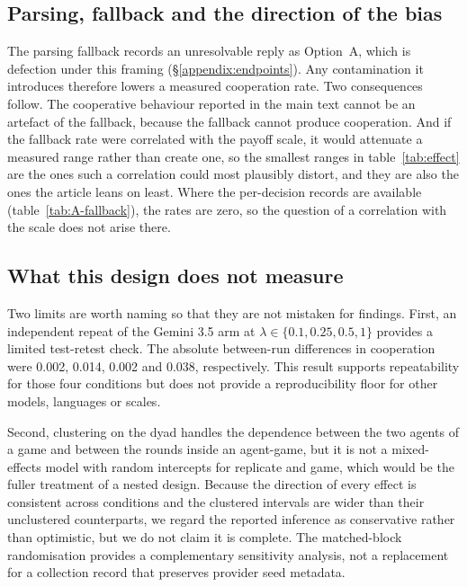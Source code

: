 \documentclass[openacc]{rsproca_new}
\newcommand{\lam}{\lambda}
\newcommand{\rev}[1]{{\color{red}#1}}
\newcommand{\rev}[1]{#1}
\begin{document}
\subsection{Parsing, fallback and the direction of the bias}\label{appendix:robust_parsing}

The parsing fallback records an unresolvable reply as Option~A, which is
defection under this framing (\S\ref{appendix:endpoints}). Any contamination it
introduces therefore lowers a measured cooperation rate. Two consequences
follow. The cooperative behaviour reported in the main text cannot be an
artefact of the fallback, because the fallback cannot produce cooperation. And
if the fallback rate were correlated with the payoff scale, it would attenuate
a measured range rather than create one, so the smallest ranges in
table~\ref{tab:effect} are the ones such a correlation could most plausibly
distort, and they are also the ones the article leans on least. \rev{Where the
per-decision records are available (table~\ref{tab:A-fallback}), the rates are
zero, so the question of a correlation with the scale does not arise there.}

\subsection{What this design does not measure}\label{appendix:robust_gaps}

Two limits are worth naming so that they are not mistaken for findings.
First, an independent repeat of the Gemini 3.5 arm at $\lam \in
\{0.1,0.25,0.5,1\}$ provides a limited test-retest check. The absolute
between-run differences in cooperation were 0.002, 0.014, 0.002 and 0.038,
respectively. This result supports repeatability for those four conditions but
does not provide a reproducibility floor for other models, languages or scales.

Second, clustering on the dyad handles the dependence between the two agents of
a game and between the rounds inside an agent-game, but it is not a
mixed-effects model with random intercepts for replicate and game, which would
be the fuller treatment of a nested design. Because the direction of every
effect is consistent across conditions and the clustered intervals are wider
than their unclustered counterparts, we regard the reported inference as
conservative rather than optimistic, but we do not claim it is complete.
The matched-block randomisation provides a complementary sensitivity analysis,
not a replacement for a collection record that preserves provider seed metadata.
\end{document}
